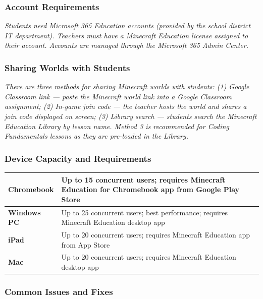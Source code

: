 \documentclass[11pt,letterpaper]{article}
\begin{document}
\subsubsection{Account Requirements}

\textit{Students need Microsoft 365 Education accounts (provided by the school district IT department). Teachers must have a Minecraft Education license assigned to their account. Accounts are managed through the Microsoft 365 Admin Center.}

\subsubsection{Sharing Worlds with Students}

\textit{There are three methods for sharing Minecraft worlds with students: (1) Google Classroom link --- paste the Minecraft world link into a Google Classroom assignment; (2) In-game join code --- the teacher hosts the world and shares a join code displayed on screen; (3) Library search --- students search the Minecraft Education Library by lesson name. Method 3 is recommended for Coding Fundamentals lessons as they are pre-loaded in the Library.}

\subsubsection{Device Capacity and Requirements}

\begin{longtable}{|L{0.28\textwidth}|L{0.65\textwidth}|}
\hline
{}
\textbf{Chromebook}  & Up to 15 concurrent users; requires Minecraft Education for Chromebook app from Google Play Store  \\
\hline
\textbf{Windows PC}  & Up to 25 concurrent users; best performance; requires Minecraft Education desktop app  \\
\hline
\textbf{iPad}  & Up to 20 concurrent users; requires Minecraft Education app from App Store  \\
\hline
\textbf{Mac}  & Up to 20 concurrent users; requires Minecraft Education desktop app  \\
\hline
\end{longtable}

\subsubsection{Common Issues and Fixes}
\end{document}
